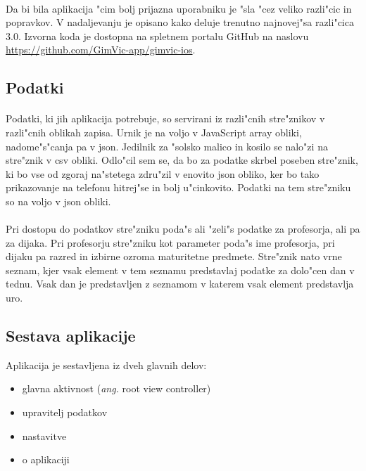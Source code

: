 \paragraph{}Da bi bila aplikacija "cim bolj prijazna uporabniku je "sla "cez veliko razli"cic in popravkov. V nadaljevanju je opisano kako deluje trenutno najnovej"sa razli"cica 3.0. Izvorna koda je dostopna na spletnem portalu GitHub na naslovu \url{https://github.com/GimVic-app/gimvic-ios}.

\subsection{Podatki} 
\paragraph{}Podatki, ki jih aplikacija potrebuje, so servirani iz razli"cnih stre"znikov v razli"cnih oblikah zapisa. Urnik je na voljo v JavaScript array obliki, nadome"s"canja pa v json. Jedilnik za "solsko malico in kosilo se nalo"zi na stre"znik v csv obliki. Odlo"cil sem se, da bo za podatke skrbel poseben stre"znik, ki bo vse od zgoraj na"stetega zdru"zil v enovito json obliko, ker bo tako prikazovanje na telefonu hitrej"se in bolj u"cinkovito. Podatki na tem stre"zniku so na voljo v json obliki.

\paragraph{}Pri dostopu do podatkov stre"zniku poda"s ali "zeli"s podatke za profesorja, ali pa za dijaka. Pri profesorju stre"zniku kot parameter poda"s ime profesorja, pri dijaku pa razred in izbirne ozroma maturitetne predmete. Stre"znik nato vrne seznam, kjer vsak element v tem seznamu predstavlaj podatke za dolo"cen dan v tednu. Vsak dan je predstavljen z seznamom v katerem vsak element predstavlja uro.

\newpage
\subsection{Sestava aplikacije}
Aplikacija je sestavljena iz dveh glavnih delov:
\begin{itemize}
	\setlength\itemsep{0em}
	\item glavna aktivnost (\textit{ang.} root view controller)
	\item upravitelj podatkov
	\item nastavitve
	\item o aplikaciji
\end{itemize}

